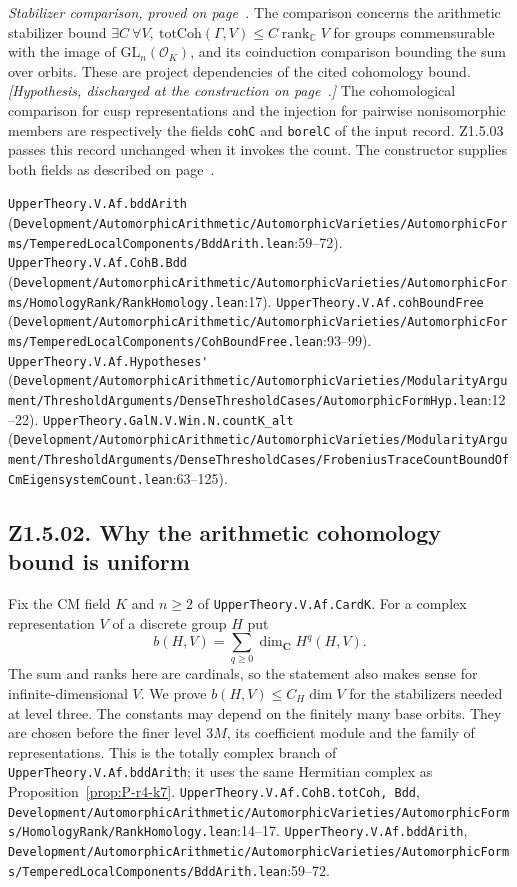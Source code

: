 \textit{Stabilizer comparison, proved on page~\pageref{r6:Z1.5.02}.} The comparison concerns the arithmetic stabilizer bound $\exists C\ \forall V,\ \mathrm{totCoh}(\Gamma,V)\le C\operatorname{rank}_{\mathbb C}V$ for groups commensurable with the image of $\mathrm{GL}_n(\mathcal O_K)$, and its coinduction comparison bounding the sum over orbits. These are project dependencies of the cited cohomology bound. \textit{[Hypothesis, discharged at the construction on page~\pageref{r7:review:Z1.5.02}.]} The cohomological comparison for cusp representations and the injection for pairwise nonisomorphic members are respectively the fields \nolinkurl{cohC} and \nolinkurl{borelC} of the input record. Z1.5.03 passes this record unchanged when it invokes the count. The constructor supplies both fields as described on page~\pageref{r7:review:Z1.5.02}.
\par{\footnotesize \nolinkurl{UpperTheory.V.Af.bddArith} (\nolinkurl{Development/AutomorphicArithmetic/AutomorphicVarieties/AutomorphicForms/TemperedLocalComponents/BddArith.lean}\allowbreak:59--72). \nolinkurl{UpperTheory.V.Af.CohB.Bdd} (\nolinkurl{Development/AutomorphicArithmetic/AutomorphicVarieties/AutomorphicForms/HomologyRank/RankHomology.lean}\allowbreak:17). \nolinkurl{UpperTheory.V.Af.cohBoundFree} (\nolinkurl{Development/AutomorphicArithmetic/AutomorphicVarieties/AutomorphicForms/TemperedLocalComponents/CohBoundFree.lean}\allowbreak:93--99). \nolinkurl{UpperTheory.V.Af.Hypotheses'} (\nolinkurl{Development/AutomorphicArithmetic/AutomorphicVarieties/ModularityArgument/ThresholdArguments/DenseThresholdCases/AutomorphicFormHyp.lean}\allowbreak:12--22). \nolinkurl{UpperTheory.GalN.V.Win.N.countK_alt} (\nolinkurl{Development/AutomorphicArithmetic/AutomorphicVarieties/ModularityArgument/ThresholdArguments/DenseThresholdCases/FrobeniusTraceCountBoundOfCmEigensystemCount.lean}\allowbreak:63--125).\par}

\subsection{Z1.5.02. Why the arithmetic cohomology bound is uniform}\label{r6:Z1.5.02}
Fix the CM field $K$ and $n\ge2$ of \nolinkurl{UpperTheory.V.Af.CardK}. For a complex representation $V$ of a discrete group $H$ put
\[
 b(H,V)=\sum_{q\ge0}\dim_{\mathbf C}H^q(H,V).
\]
The sum and ranks here are cardinals, so the statement also makes sense for infinite-dimensional $V$. We prove $b(H,V)\le C_H\dim V$ for the stabilizers needed at level three. The constants may depend on the finitely many base orbits. They are chosen before the finer level $3M$, its coefficient module and the family of representations. This is the totally complex branch of \nolinkurl{UpperTheory.V.Af.bddArith}; it uses the same Hermitian complex as Proposition~\ref{prop:P-r4-k7}. {\footnotesize\nolinkurl{UpperTheory.V.Af.CohB.totCoh, Bdd}, \nolinkurl{Development/AutomorphicArithmetic/AutomorphicVarieties/AutomorphicForms/HomologyRank/RankHomology.lean}\allowbreak:14--17.} {\footnotesize\nolinkurl{UpperTheory.V.Af.bddArith}, \nolinkurl{Development/AutomorphicArithmetic/AutomorphicVarieties/AutomorphicForms/TemperedLocalComponents/BddArith.lean}\allowbreak:59--72.}

